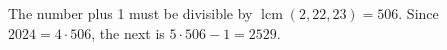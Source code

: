 The number plus 1 must be divisible by $\operatorname{lcm}(2,22,23)=506$. Since $2024=4\cdot506$, the next is $5\cdot506-1=\boxed{2529}$.
